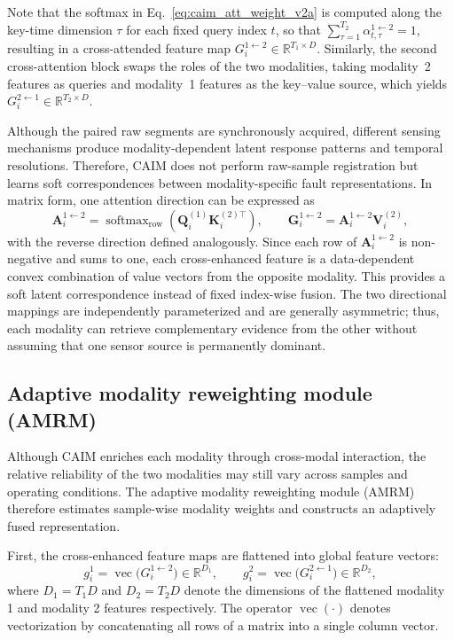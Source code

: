 \documentclass[a4paper]{cas-sc}
\begin{document}
Note that the softmax in Eq.~\eqref{eq:caim_att_weight_v2a} is computed along the key-time dimension
$\tau$ for each fixed query index $t$, so that $\sum_{\tau=1}^{T_2}\alpha_{t,\tau}^{1\leftarrow 2}=1$,
resulting in a cross-attended feature map $G_i^{1 \leftarrow 2} \in \mathbb{R}^{T_1 \times D}$. Similarly, the second cross-attention block swaps the roles of the two modalities,
taking modality~2 features as queries and modality~1 features as the key--value source,
which yields $G_i^{2 \leftarrow 1} \in \mathbb{R}^{T_2 \times D}$.

Although the paired raw segments are synchronously acquired, different sensing mechanisms produce modality-dependent latent response patterns and temporal resolutions. Therefore, CAIM does not perform raw-sample registration but learns soft correspondences between modality-specific fault representations. In matrix form, one attention direction can be expressed as
\begin{equation}
\mathbf{A}_{i}^{1\leftarrow2}
=
\operatorname{softmax}_{\mathrm{row}}
\left(
\mathbf{Q}_{i}^{(1)}
\mathbf{K}_{i}^{(2)\top}
\right),
\qquad
\mathbf{G}_{i}^{1\leftarrow2}
=
\mathbf{A}_{i}^{1\leftarrow2}
\mathbf{V}_{i}^{(2)},
\end{equation}
with the reverse direction defined analogously. Since each row of $\mathbf{A}_{i}^{1\leftarrow2}$ is non-negative and sums to one, each cross-enhanced feature is a data-dependent convex combination of value vectors from the opposite modality. This provides a soft
latent correspondence instead of fixed index-wise fusion. The two directional mappings are independently parameterized and are generally asymmetric; thus, each modality can retrieve complementary evidence from the other without assuming that one sensor source is permanently dominant.

\subsection{Adaptive modality reweighting module (AMRM)}
\label{subsec:amrm}

Although CAIM enriches each modality through cross-modal interaction, the relative reliability of the two modalities may still vary across samples and operating conditions. The adaptive modality reweighting module (AMRM) therefore estimates sample-wise modality weights and constructs an adaptively fused representation.

First, the cross-enhanced feature maps are flattened into global feature vectors:
\begin{equation}
    g_i^{1} = \operatorname{vec}\!\big( G_i^{1 \leftarrow 2} \big) \in \mathbb{R}^{D_1}, \qquad
    g_i^{2} = \operatorname{vec}\!\big( G_i^{2 \leftarrow 1} \big) \in \mathbb{R}^{D_2},
    \label{eq:amrm_flatten}
\end{equation}
where $D_1 = T_1 D$ and $D_2 = T_2 D$ denote the dimensions of the flattened modality 1 and modality 2 features respectively. The operator $\operatorname{vec}(\cdot)$ denotes vectorization by concatenating all rows of a matrix
into a single column vector. 
\end{document}
